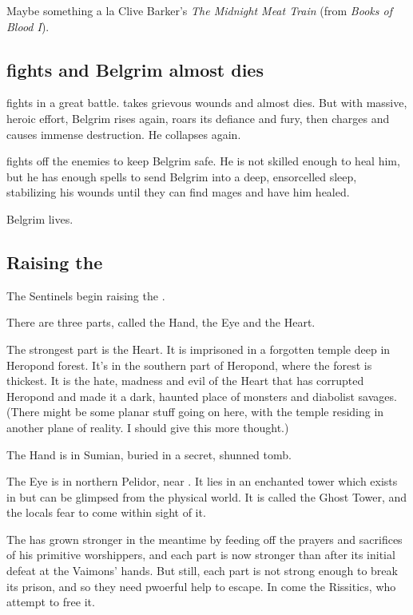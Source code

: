 \begin{garbage}
Maybe something a la Clive Barker's \emph{The Midnight Meat Train} (from \emph{Books of Blood I}). 









\subsection{\Narkiza{} fights and Belgrim almost dies}
 fights in a great battle.  takes grievous wounds and almost dies. But with massive, heroic effort, Belgrim rises again, roars its defiance and fury, then charges and causes immense destruction. He collapses again. 

\Narkiza{} fights off the enemies to keep Belgrim safe. He is not skilled enough to heal him, but he has enough spells to send Belgrim into a deep, ensorcelled sleep, stabilizing his wounds until they can find mages and have him healed. 

Belgrim lives.









\subsection{Raising the \Haskelek}
The Sentinels begin raising the \Haskelek. 

There are three parts, called the Hand, the Eye and the Heart. 

The strongest part is the Heart. It is imprisoned in a forgotten temple deep in Heropond forest. It's in the southern part of Heropond, where the forest is thickest. It is the hate, madness and evil of the \Haskelek{} Heart that has corrupted Heropond and made it a dark, haunted place of monsters and diabolist savages. (There might be some planar stuff going on here, with the temple residing in another plane of reality. I should give this more thought.) 

The Hand is in Sumian, buried in a secret, shunned tomb. 

The Eye is in northern Pelidor, near \Forklin. It lies in an enchanted tower which exists in \Nyx{} but can be glimpsed from the physical world. It is called the Ghost Tower, and the locals fear to come within sight of it. 

The \Haskelek{} has grown stronger in the meantime by feeding off the prayers and sacrifices of his primitive worshippers, and each part is now stronger than after its initial defeat at the Vaimons' hands. But still, each part is not strong enough to break its prison, and so they need pwoerful help to escape. In come the Rissitics, who attempt to free it. 


\end{garbage}
